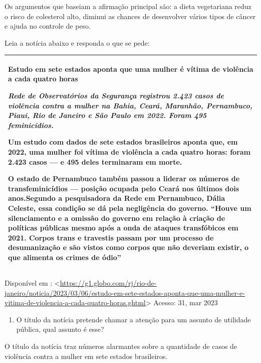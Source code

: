 {Os argumentos que baseiam a afirmação principal são: a dieta vegetariana
reduz o risco de colesterol alto, diminui as chances de desenvolver
vários tipos de câncer e ajuda no controle de peso.

Leia a notícia abaixo e responda o que se pede:

\begin{longtable}[]{@{}
  >{\raggedright\arraybackslash}p{}@{}}
\toprule
\endhead
\textbf{Estudo em sete estados aponta que uma mulher é vítima de
violência a cada quatro horas}

\emph{Rede de Observatórios da Segurança registrou 2.423 casos de
violência contra a mulher na Bahia, Ceará, Maranhão, Pernambuco, Piauí,
Rio de Janeiro e São Paulo em 2022. Foram 495 feminicídios.}

Um estudo com dados de sete estados brasileiros aponta que, em 2022, uma
mulher foi vítima de violência a cada quatro horas: foram 2.423 casos
--- e 495 deles terminaram em morte.

O estado de Pernambuco também passou a liderar os números de
transfeminicídios --- posição ocupada pelo Ceará nos últimos dois
anos.Segundo a pesquisadora da Rede em Pernambuco, Dália Celeste, essa
condição se dá pela negligência do governo. ``Houve um silenciamento e a
omissão do governo em relação à criação de políticas públicas mesmo após
a onda de ataques transfóbicos em 2021. Corpos trans e travestis passam
por um processo de desumanização e são vistos como corpos que não
deveriam existir, o que alimenta os crimes de ódio'' \\
\bottomrule
\end{longtable}

Disponível em :
\textless{}\href{https://g1.globo.com/rj/rio-de-janeiro/noticia/2023/03/06/estudo-em-sete-estados-aponta-que-uma-mulher-e-vitima-de-violencia-a-cada-quatro-horas.ghtml}{\uline{https://g1.globo.com/rj/rio-de-janeiro/noticia/2023/03/06/estudo-em-sete-estados-aponta-que-uma-mulher-e-vitima-de-violencia-a-cada-quatro-horas.ghtml}}\textgreater{}
Acesso: 31, mar 2023

\begin{enumerate}
\def\labelenumi{\arabic{enumi}.}
\tightlist
\item
  O título da notícia pretende chamar a atenção para um assunto de
  utilidade pública, qual assunto é esse?
\end{enumerate}

O título da notícia traz números alarmantes sobre a quantidade de casos
de violência contra a mulher em sete estados brasileiros.

}

